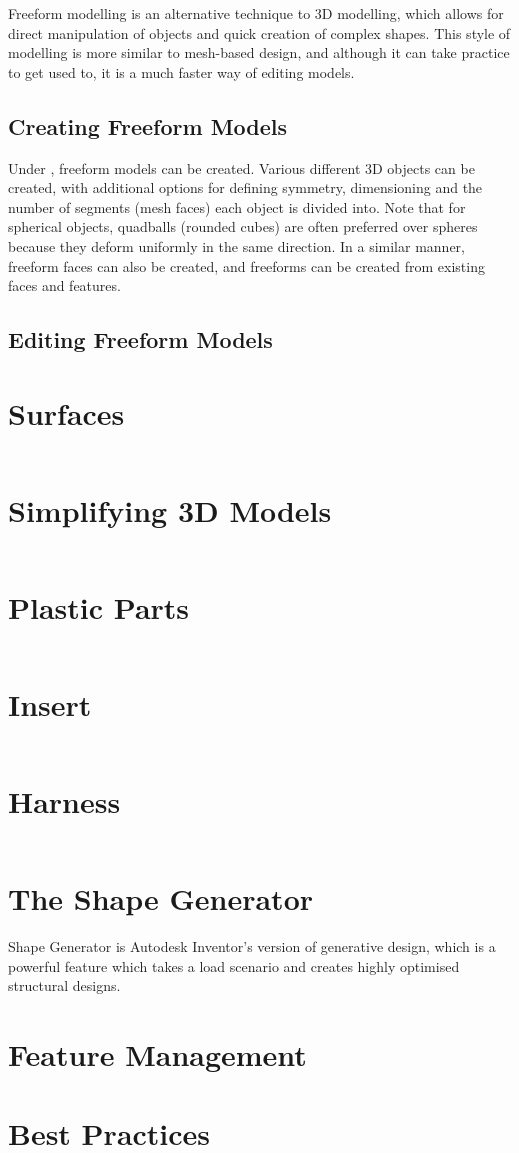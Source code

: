 Freeform modelling is an alternative technique to 3D modelling, which allows for direct manipulation of objects and quick creation of complex shapes. This style of modelling is more similar to mesh-based design, and although it can take practice to get used to, it is a much faster way of editing models.

\subsection{Creating Freeform Models}

Under , freeform models can be created. Various different 3D objects can be created, with additional options for defining symmetry, dimensioning and the number of segments (mesh faces) each object is divided into. Note that for spherical objects, quadballs (rounded cubes) are often preferred over spheres because they deform uniformly in the same direction. In a similar manner, freeform faces can also be created, and freeforms can be created from existing faces and features.

\subsection{Editing Freeform Models}



\section{Surfaces}
\label{section: 3D Model Surface}

$ $

\section{Simplifying 3D Models}

$ $

\section{Plastic Parts}

$ $

\section{Insert}

$ $

\section{Harness}

$ $

\section{The Shape Generator}
Shape Generator is Autodesk Inventor's version of generative design, which is a powerful feature which takes a load scenario and creates highly optimised structural designs.

\section{Feature Management}

\section{Best Practices}